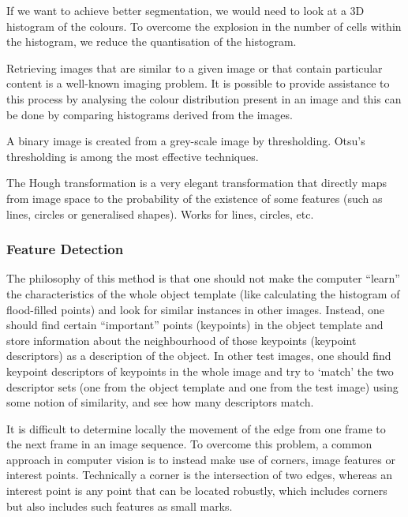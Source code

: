 If we want to achieve better segmentation, we would need to look at a 3D histogram of the colours.
To overcome the explosion in the number of cells within the histogram, we reduce the quantisation of the histogram. 

Retrieving images that are similar to a given image or that contain particular content is a well-known imaging problem.
It is possible to provide assistance to this process by analysing the colour distribution present in an image and this can be done by comparing histograms derived from the images.

A binary image is created from a grey-scale image by thresholding. 
Otsu's thresholding is among the most effective techniques.

The Hough transformation is a very elegant transformation that directly maps from image space to the probability of the existence of some features (such as lines, circles or generalised shapes). Works for lines, circles, etc.

\subsubsection{Feature Detection}

The philosophy of this method is that one should not make the computer ``learn'' the characteristics of the whole object template (like calculating the histogram of flood-filled points) and look for similar instances in other images. Instead, one should find certain ``important'' points (keypoints) in the object template and store information about the neighbourhood of those keypoints (keypoint descriptors) as a description of the object. In other test images, one should find keypoint descriptors of keypoints in the whole image and try to `match' the two descriptor sets (one from the object template and one from the test image) using some notion of similarity, and see how many descriptors match.

It is difficult to determine locally the movement of the edge from one frame to the next frame in an image sequence. 
To overcome this problem, a common approach in computer vision is to instead make use of corners, image features or interest points.
Technically a corner is the intersection of two edges, whereas an interest point is any point that can be located robustly, which includes corners but also includes such features as small marks.

